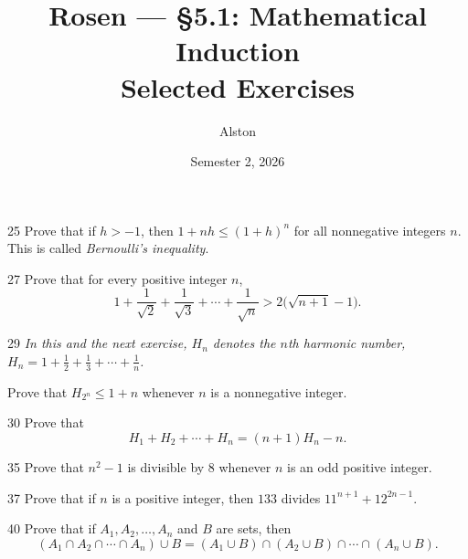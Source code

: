 \documentclass[11pt]{article}
\title{Rosen --- \S 5.1: Mathematical Induction\\ \large Selected Exercises}
\author{Alston}
\date{Semester 2, 2026}
\begin{document}
\maketitle

\begin{exercise}{25}
    Prove that if $h > -1$, then $1 + nh \leq (1+h)^n$ for all
    nonnegative integers $n$. This is called \emph{Bernoulli's
    inequality}.
\end{exercise}

\begin{exercise}{27}
    Prove that for every positive integer $n$,
    \[
    1 + \frac{1}{\sqrt{2}} + \frac{1}{\sqrt{3}} + \cdots +
    \frac{1}{\sqrt{n}} > 2\big(\sqrt{n+1} - 1\big).
    \]
\end{exercise}

\begin{exercise}{29}
    \textit{In this and the next exercise, $H_n$ denotes the $n$th
    harmonic number, $H_n = 1 + \frac12 + \frac13 + \cdots +
    \frac1n$.}

    Prove that $H_{2^n} \leq 1 + n$ whenever $n$ is a nonnegative
    integer.
\end{exercise}

\begin{exercise}{30}
    Prove that
    \[
    H_1 + H_2 + \cdots + H_n = (n+1)H_n - n.
    \]
\end{exercise}

\begin{exercise}{35}
    Prove that $n^2 - 1$ is divisible by $8$ whenever $n$ is an odd
    positive integer.
\end{exercise}

\begin{exercise}{37}
    Prove that if $n$ is a positive integer, then $133$ divides
    $11^{n+1} + 12^{2n-1}$.
\end{exercise}

\begin{exercise}{40}
    Prove that if $A_1, A_2, \dots, A_n$ and $B$ are sets, then
    \[
    (A_1 \cap A_2 \cap \cdots \cap A_n) \cup B
    = (A_1 \cup B) \cap (A_2 \cup B) \cap \cdots \cap (A_n \cup B).
    \]
\end{exercise}
\end{document}
